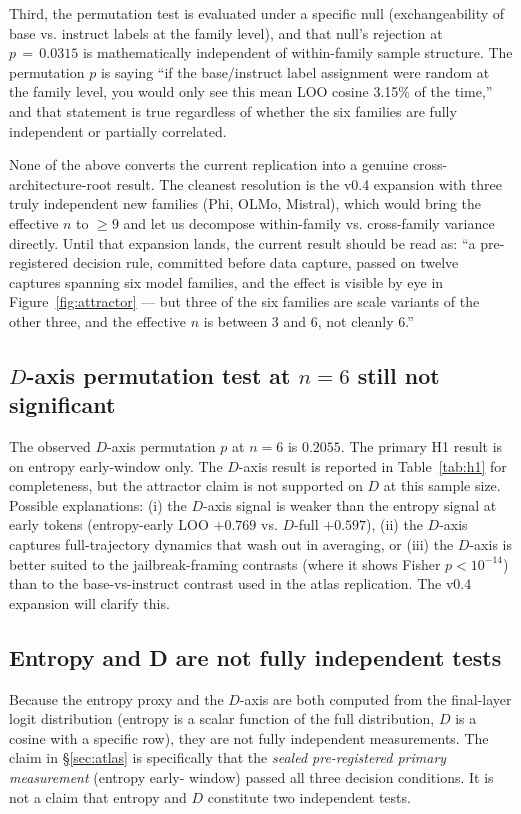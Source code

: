 \documentclass[11pt,letterpaper]{article}
\begin{document}
Third, the permutation test is evaluated under a specific null
(exchangeability of base vs. instruct labels at the family level), and
that null's rejection at $p\,=\,0.0315$ is mathematically independent of
within-family sample structure. The permutation $p$ is saying ``if the
base/instruct label assignment were random at the family level, you
would only see this mean LOO cosine 3.15\% of the time,'' and that
statement is true regardless of whether the six families are fully
independent or partially correlated.

None of the above converts the current replication into a genuine
cross-architecture-root result. The cleanest resolution is the v0.4
expansion with three truly independent new families (Phi, OLMo, Mistral),
which would bring the effective $n$ to $\geq 9$ and let us decompose
within-family vs. cross-family variance directly. Until that expansion
lands, the current result should be read as: ``a pre-registered decision
rule, committed before data capture, passed on twelve captures spanning
six model families, and the effect is visible by eye in
Figure~\ref{fig:attractor} --- but three of the six families are scale
variants of the other three, and the effective $n$ is between 3 and 6,
not cleanly 6.''

\subsection{$D$-axis permutation test at $n\!=\!6$ still not significant}

The observed $D$-axis permutation $p$ at $n\!=\!6$ is $0.2055$. The primary
H1 result is on entropy early-window only. The $D$-axis result is reported
in Table~\ref{tab:h1} for completeness, but the attractor claim is not
supported on $D$ at this sample size. Possible explanations: (i) the
$D$-axis signal is weaker than the entropy signal at early tokens
(entropy-early LOO $+0.769$ vs. $D$-full $+0.597$), (ii) the $D$-axis
captures full-trajectory dynamics that wash out in averaging, or (iii) the
$D$-axis is better suited to the jailbreak-framing contrasts (where it
shows Fisher $p\!<\!10^{-14}$) than to the base-vs-instruct contrast used
in the atlas replication. The v0.4 expansion will clarify this.

\subsection{Entropy and D are not fully independent tests}

Because the entropy proxy and the $D$-axis are both computed from the
final-layer logit distribution (entropy is a scalar function of the full
distribution, $D$ is a cosine with a specific row), they are not fully
independent measurements. The claim in \S\ref{sec:atlas} is specifically
that the \emph{sealed pre-registered primary measurement} (entropy early-
window) passed all three decision conditions. It is not a claim that
entropy and $D$ constitute two independent tests.
\end{document}
